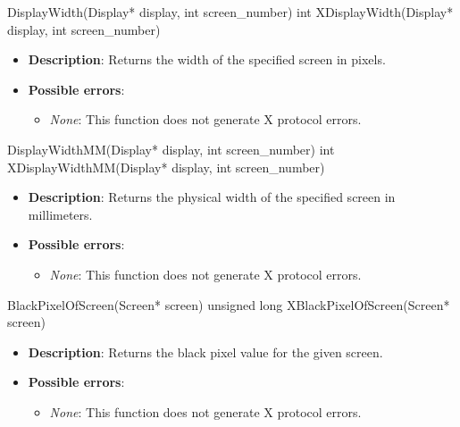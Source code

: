 \documentclass{report}
\begin{document}
\begin{itemize}
        \begin{cppcode}
            DisplayWidth(Display* display, int screen_number)
            int XDisplayWidth(Display* display, int screen_number)
        \end{cppcode}
        \begin{itemize}
            \item \textbf{Description}: Returns the width of the specified screen in pixels.
            \item \textbf{Possible errors}:
                \begin{itemize}
                    \item \textit{None}: This function does not generate X protocol errors.
                \end{itemize}
        \end{itemize}

        \begin{cppcode}
            DisplayWidthMM(Display* display, int screen_number)
            int XDisplayWidthMM(Display* display, int screen_number)
        \end{cppcode}
        \begin{itemize}
            \item \textbf{Description}: Returns the physical width of the specified screen in millimeters.
            \item \textbf{Possible errors}:
                \begin{itemize}
                    \item \textit{None}: This function does not generate X protocol errors.
                \end{itemize}
        \end{itemize}

        \begin{cppcode}
            BlackPixelOfScreen(Screen* screen)
            unsigned long XBlackPixelOfScreen(Screen* screen)
        \end{cppcode}
        \begin{itemize}
            \item \textbf{Description}: Returns the black pixel value for the given screen.
            \item \textbf{Possible errors}:
                \begin{itemize}
                    \item \textit{None}: This function does not generate X protocol errors.
                \end{itemize}
        \end{itemize}


\end{itemize}
\end{document}
